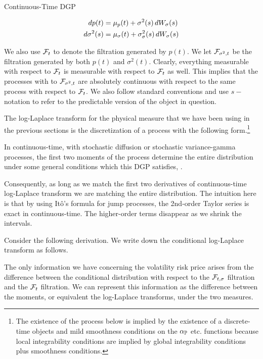 \documentclass[11pt, letterpaper, twoside, final]{article}
\begin{document}
\begin{defn}{Continuous-Time DGP}
    \label{defn:cont_time_dgp}

    \begin{align}
        \mathop{}\!d p(t) &= \mu_{p}(t) + \sigma^2(s) \mathop{}\!d W_{\sigma}(s)  \\
        \mathop{}\!d \sigma^2(s)  &= \mu_{\sigma}(t) + \sigma_{\sigma}^2(s) \mathop{}\!d W_{\sigma}(s) 
    \end{align}

\end{defn}

We also use  $\mathcal{F}_t$ to denote the filtration generated by $p(t)$.
We let $\mathcal{F}_{\sigma^2, t}$ be the filtration generated by both $p(t)$ and $\sigma^2(t)$.
Clearly, everything measurable with respect to $\mathcal{F}_t$ is measurable with respect to $\mathcal{F}_t$ as well.
This implies that the processes with to $\mathcal{F}_{\sigma^2, t}$ are absolutely continuous with respect to the same
process with respect to $\mathcal{F}_t$.
We also follow standard conventions and use $s-$ notation to refer to the predictable version of the object in
question. 

The log-Laplace transform for the physical measure that we have been using in the previous sections is the
discretization of a process with the following form.\footnote{The existence of the process below is implied
    by the existence of a discrete-time objects and mild smoothness conditions on the $\alpha_{\mathbb{P}}$ etc.\@
    functions because local integrability conditions are implied by global integrability conditions plus
smoothness conditions.}

In continuous-time, with stochastic diffusion or stochastic variance-gamma processes, the first two moments of the
process determine the entire distribution under some general conditions which this DGP satisfies,
\parencite{sangrey2018jumps}.

Consequently, as long as we match the first two derivatives of continuous-time log-Laplace transform we are
matching the entire distribution.
The intuition here is that by using It\^{o}'s formula for jump  processes, the 2nd-order Taylor series is exact in
continuous-time.
The higher-order  terms disappear as we shrink the intervals. 


Consider the following derivation.
We write down the conditional log-Laplace transform as follows.

The only information we have concerning the volatility risk price arises from the difference between the
conditional distribution with respect to the $\mathcal{F}_{t, \sigma}$ filtration and the $\mathcal{F}_{t}$ filtration.
We can represent this information as the difference between the moments, or equivalent the log-Laplace
transforms, under the two measures. 
\end{document}
